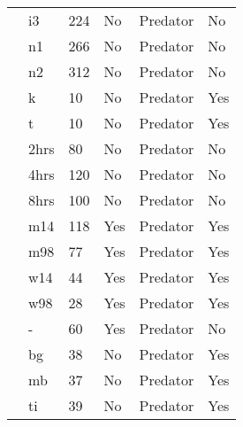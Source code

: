 \begin{longtable}{llllll}
\citet{Uttley:1980aa}&i3&224&No&Predator&No\tabularnewline
\citet{Uttley:1980aa}&n1&266&No&Predator&No\tabularnewline
\citet{Uttley:1980aa}&n2&312&No&Predator&No\tabularnewline
\citet{Vahl:2005aa}&k&10&No&Predator&Yes\tabularnewline
\citet{Vahl:2005aa}&t&10&No&Predator&Yes\tabularnewline
\citet{Von-Westernhagen:1976aa}&2hrs&80&No&Predator&No\tabularnewline
\citet{Von-Westernhagen:1976aa}&4hrs&120&No&Predator&No\tabularnewline
\citet{Von-Westernhagen:1976aa}&8hrs&100&No&Predator&No\tabularnewline
\citet{Vucetich:2002aa}&m14&118&Yes&Predator&Yes\tabularnewline
\citet{Vucetich:2002aa}&m98&77&Yes&Predator&Yes\tabularnewline
\citet{Vucetich:2002aa}&w14&44&Yes&Predator&Yes\tabularnewline
\citet{Vucetich:2002aa}&w98&28&Yes&Predator&Yes\tabularnewline
\citet{Walde:1984aa}&-&60&Yes&Predator&No\tabularnewline
\citet{Wasserman:2016aa}&bg&38&No&Predator&Yes\tabularnewline
\citet{Wasserman:2016aa}&mb&37&No&Predator&Yes\tabularnewline
\citet{Wasserman:2016aa}&ti&39&No&Predator&Yes\tabularnewline
\hline
\end{longtable}
